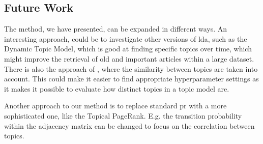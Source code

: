 \subsection{Future Work}\label{sec:future_work}

The method, we have presented, can be expanded in different ways. 
An interesting approach, could be to investigate other versions of \gls{lda}, such as the Dynamic Topic Model\cite{blei2006dynamic}, which is good at finding specific topics over time, which might improve the retrieval of old and important articles within a large dataset.
There is also the approach of \citeauthor{blei2007correlated}\cite{blei2007correlated}, where the similarity between topics are taken into account.
This could make it easier to find appropriate hyperparameter settings as it makes it possible to evaluate how distinct topics in a topic model are.

Another approach to our method is to replace standard \gls{pr} with a more sophisticated one, like the Topical PageRank\cite{yang2009topic}. 
E.g. the transition probability within the adjacency matrix can be changed to focus on the correlation between topics.
